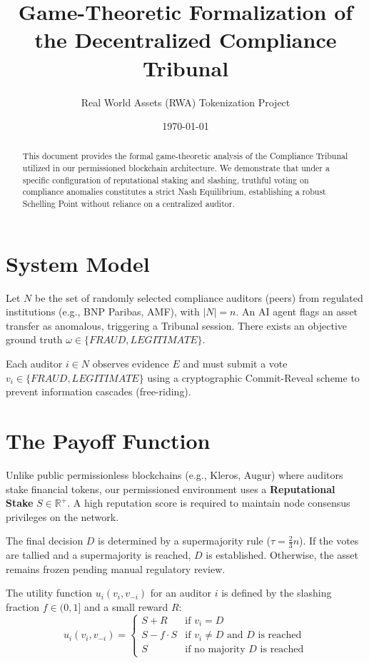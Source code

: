 \documentclass[11pt,a4paper]{article}
\title{Game-Theoretic Formalization of the Decentralized Compliance Tribunal}
\author{Real World Assets (RWA) Tokenization Project}
\date{\today}
\begin{document}
\maketitle

\begin{abstract}
This document provides the formal game-theoretic analysis of the Compliance Tribunal utilized in our permissioned blockchain architecture. We demonstrate that under a specific configuration of reputational staking and slashing, truthful voting on compliance anomalies constitutes a strict Nash Equilibrium, establishing a robust Schelling Point without reliance on a centralized auditor.
\end{abstract}

\section{System Model}
Let $N$ be the set of randomly selected compliance auditors (peers) from regulated institutions (e.g., BNP Paribas, AMF), with $|N| = n$.
An AI agent flags an asset transfer as anomalous, triggering a Tribunal session. 
There exists an objective ground truth $\omega \in \{FRAUD, LEGITIMATE\}$.

Each auditor $i \in N$ observes evidence $E$ and must submit a vote $v_i \in \{FRAUD, LEGITIMATE\}$ using a cryptographic Commit-Reveal scheme to prevent information cascades (free-riding).

\section{The Payoff Function}
Unlike public permissionless blockchains (e.g., Kleros, Augur) where auditors stake financial tokens, our permissioned environment uses a \textbf{Reputational Stake} $S \in \mathbb{R}^+$. A high reputation score is required to maintain node consensus privileges on the network.

The final decision $D$ is determined by a supermajority rule ($\tau = \frac{2}{3}n$).
If the votes are tallied and a supermajority is reached, $D$ is established. Otherwise, the asset remains frozen pending manual regulatory review.

The utility function $u_i(v_i, v_{-i})$ for an auditor $i$ is defined by the slashing fraction $f \in (0, 1]$ and a small reward $R$:
\begin{equation}
u_i(v_i, v_{-i}) = 
\begin{cases} 
S + R & \text{if } v_i = D \\
S - f \cdot S & \text{if } v_i \neq D \text{ and } D \text{ is reached}\\
S & \text{if no majority } D \text{ is reached}
\end{cases}
\end{equation}
\end{document}
